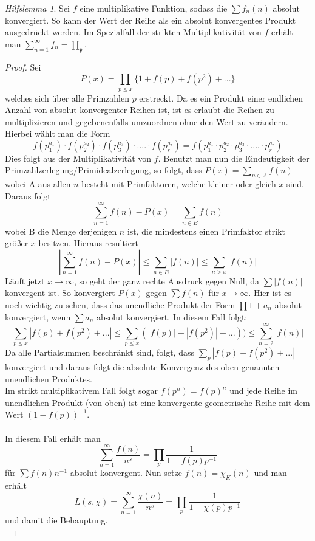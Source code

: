 \documentclass[10pt,a4paper]{article}
\theoremstyle{plain}
\theoremstyle{definition}
\theoremstyle{remark}
\newtheorem{hilfslem}{Hilfslemma}
\begin{document}
 \begin{hilfslem}\label{hilfslemma3}
Sei $f$ eine multiplikative Funktion, sodass die $\sum f_n(n)$ absolut konvergiert. So kann der Wert der Reihe als ein absolut konvergentes Produkt ausgedrückt werden. Im Spezialfall der strikten Multiplikativität von $f$ erhält man $\sum_{n=1}^{\infty}f_n=\prod_{\mathfrak{p}}$.

\begin{proof}

Sei $$P(x)= \prod_{p\leq x}\{1+f(p)+f(p^2)+...\}$$welches sich über alle Primzahlen $p$ erstreckt. Da es ein Produkt einer endlichen Anzahl von absolut konvergenter Reihen ist, ist es erlaubt die Reihen zu multiplizieren und gegebenenfalls umzuordnen ohne den Wert zu verändern. Hierbei wählt man die Form
$$f(p_1^{a_1})\cdot f(p_2^{a_2})\cdot f(p_3^{a_3})\cdot....\cdot f(p_{r}^{a_r})=f(p_{1}^{a_1}\cdot p_{2}^{a_2}\cdot p_{3}^{a_3}\cdot ....\cdot p_{r}^{a_r})$$Dies folgt aus der Multiplikativität von $f$. Benutzt man nun die Eindeutigkeit der Primzahlzerlegung/Primidealzerlegung, so folgt, dass $P(x)=\sum_{n \in A}f(n)$ wobei A aus allen $n$ besteht mit Primfaktoren, welche kleiner oder gleich $x$  sind. Daraus folgt $$\sum_{n=1}^{\infty}f(n)-P(x)= \sum_{n \in B}f(n)$$wobei B die Menge derjenigen $n$ ist, die mindestens einen Primfaktor strikt größer $x$ besitzen. Hieraus resultiert$$|\sum_{n=1}^{\infty}f(n)-P(x)|\leq\sum_{n \in B}|f(n)|\leq\sum_{n > x}|f(n)|$$ Läuft jetzt $x\to\infty$, so geht der ganz rechte Ausdruck gegen Null, da $\sum|f(n)|$ konvergent ist. So konvergiert $P(x)$ gegen $\sum f(n)$ für $x \to \infty$. Hier ist es noch wichtig zu sehen, dass das unendliche Produkt der Form $\prod1+a_n$ absolut konvergiert, wenn $\sum a_n$ absolut konvergiert. In diesem Fall folgt:$$\sum_{p\leq x}|f(p)+f(p^2)+...| \leq \sum_{p \leq x}(|f(p)|+|f(p^2)|+...))\leq \sum_{n=2}^{\infty}|f(n)|$$Da alle Partialsummen beschränkt sind, folgt, dass $\sum_{p}|f(p)+f(p^2)+...|$ konvergiert und daraus folgt die absolute Konvergenz des oben genannten unendlichen Produktes.
\\
Im strikt multiplikativem Fall folgt sogar $f(p^n)=f(p)^n$ und jede Reihe im unendlichen Produkt (von oben) ist eine konvergente geometrische Reihe mit dem Wert $(1-f(p))^{-1}$.
\\
\\
In diesem Fall  erhält man $$\sum_{n=1}^{\infty}\frac{f(n)}{n^s}=\prod_{p}\frac{1}{1-f(p)p^{-1}}$$ für $\sum f(n)n^{-1}$ absolut konvergent. Nun setze  $f(n)=\chi_K(n)$ und man erhält $$L(s,\chi)=\sum_{n=1}^{\infty}\frac{\chi(n)}{n^s}=\prod_{p}\frac{1}{1-\chi(p)p^{-1}}$$und damit die Behauptung.\\

\end{proof}
\end{hilfslem}
\end{document}

